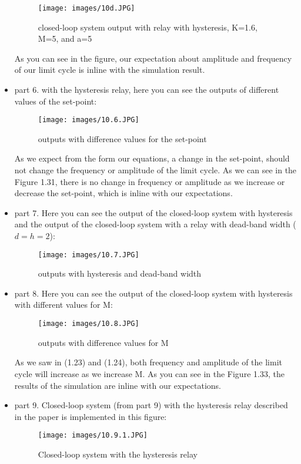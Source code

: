 \documentclass[11pt]{scrartcl} %
\begin{document}
\begin{itemize}
\begin{figure}[H]
	\centering
	\texttt{[image: images/10d.JPG]}
	\caption{closed-loop system output with relay with hysteresis, K=1.6, M=5, and a=5}
\end{figure}

As you can see in the figure, our expectation about amplitude and frequency of our limit cycle is inline with the simulation result.\\

\newpage


\item part 6. with the hysteresis relay, here you can see the outputs of different values of the set-point:
\begin{figure}[H]
	\centering
	\texttt{[image: images/10.6.JPG]}
	\caption{outputs with diﬀerence values for the set-point}
\end{figure}

As we expect from the form our equations, a change in the set-point, should not change the frequency or amplitude of the limit cycle. As we can see in the Figure 1.31, there is no change in frequency or amplitude as we increase or decrease the set-point, which is inline with our expectations.\\

\item part 7. Here you can see the output of the closed-loop system with hysteresis and the output of the closed-loop system with a relay with dead-band width ($d=h=2$):
\begin{figure}[H]
	\centering
	\texttt{[image: images/10.7.JPG]}
	\caption{outputs with hysteresis and dead-band width}
\end{figure}
\newpage

\item part 8. Here you can see the output of the closed-loop system with hysteresis with different values for M:
\begin{figure}[H]
	\centering
	\texttt{[image: images/10.8.JPG]}
	\caption{outputs with diﬀerence values for M}
\end{figure}

As we saw in (1.23) and (1.24), both frequency and amplitude of the limit cycle will increase as we increase M. As you can see in the Figure 1.33, the results of the simulation are inline with our expectations.\\


   \item part 9. Closed-loop system (from part 9) with the hysteresis relay described in the paper is implemented in this figure:
\begin{figure}[H]
	\centering
	\texttt{[image: images/10.9.1.JPG]}
	\caption{Closed-loop system with the hysteresis relay}
\end{figure}

 \end{itemize}
 
\end{document}

